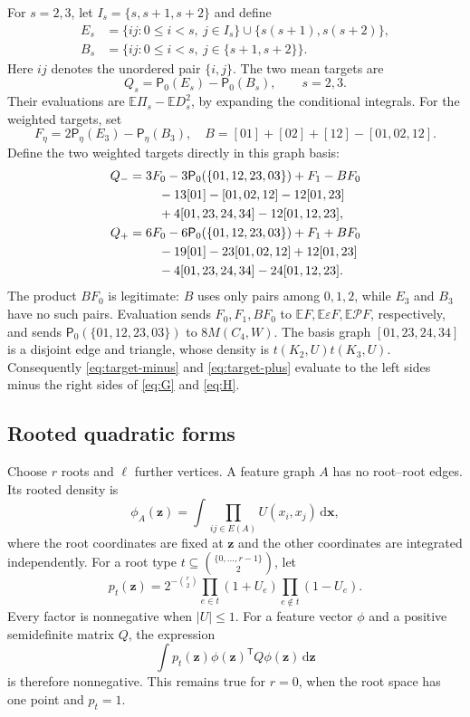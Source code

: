 \documentclass[11pt,a4paper]{article}
\theoremstyle{remark}
\numberwithin{equation}{section}
\newcommand{\E}{\mathbb E}
\newcommand{\dd}{\,\mathrm d}
\newcommand{\maj}{\mathcal P}
\begin{document}
For $s=2,3$, let $I_s=\{s,s+1,s+2\}$ and define
\begin{align*}
 E_s&=\{ij:0\leq i<s,\ j\in I_s\}
                    \cup\{s(s+1),s(s+2)\},\\
 B_s&=\{ij:0\leq i<s,\ j\in\{s+1,s+2\}\}.
\end{align*}
Here $ij$ denotes the unordered pair $\{i,j\}$.
The two mean targets are
\[
 Q_s=\mathsf P_0(E_s)-\mathsf P_0(B_s),\qquad s=2,3.
\]
Their evaluations are $\E\Pi_s-\E D_s^2$, by expanding the conditional
integrals. For the weighted targets, set
\[
F_\eta=2\mathsf P_\eta(E_3)-\mathsf P_\eta(B_3),\quad
 B=[01]+[02]+[12]-[01,02,12].
\]
Define the two weighted targets directly in this graph basis:
\begin{align}
 Q_-={}&3F_0-3\mathsf P_0(\{01,12,23,03\})+F_1-BF_0\notag\\
 &\quad-13[01]-[01,02,12]-12[01,23]\notag\\
 &\quad+4[01,23,24,34]-12[01,12,23],
 \label{eq:target-minus}\\
 Q_+={}&6F_0-6\mathsf P_0(\{01,12,23,03\})+F_1+BF_0\notag\\
 &\quad-19[01]-23[01,02,12]+12[01,23]\notag\\
 &\quad-4[01,23,24,34]-24[01,12,23].
 \label{eq:target-plus}
\end{align}
The product $BF_0$ is legitimate: $B$ uses only pairs among
$0,1,2$, while $E_3$ and $B_3$ have no such pairs.
Evaluation sends $F_0,F_1,BF_0$ to
$\E F,\E\varepsilon F,\E\maj F$, respectively, and sends
$\mathsf P_0(\{01,12,23,03\})$ to $8M(C_4,W)$.
The basis graph $[01,23,24,34]$ is a disjoint edge and triangle,
whose density is $t(K_2,U)t(K_3,U)$.
Consequently \eqref{eq:target-minus} and
\eqref{eq:target-plus} evaluate to the left sides minus the
right sides of \eqref{eq:G} and \eqref{eq:H}.

\subsection{Rooted quadratic forms}

Choose $r$ roots and $\ell$ further vertices. A feature graph $A$
has no root--root edges. Its rooted density is
\[
 \phi_A(\mathbf z)=\int
           \prod_{ij\in E(A)}U(x_i,x_j)\dd\mathbf x,
\]
where the root coordinates are fixed at $\mathbf z$ and the other
coordinates are integrated independently. For a root type
$t\subseteq\binom{\{0,\ldots,r-1\}}2$, let
\[
 p_t(\mathbf z)=2^{-\binom r2}
       \prod_{e\in t}(1+U_e)\prod_{e\notin t}(1-U_e).
\]
Every factor is nonnegative when $|U|\leq1$.
For a feature vector $\phi$ and a positive semidefinite matrix $Q$,
the expression
\begin{equation}\label{eq:rooted-sos}
 \int p_t(\mathbf z)\phi(\mathbf z)^{\mathsf T}
                      Q\phi(\mathbf z)\dd\mathbf z
\end{equation}
is therefore nonnegative. This remains true for $r=0$, when the
root space has one point and $p_t=1$.
\end{document}
